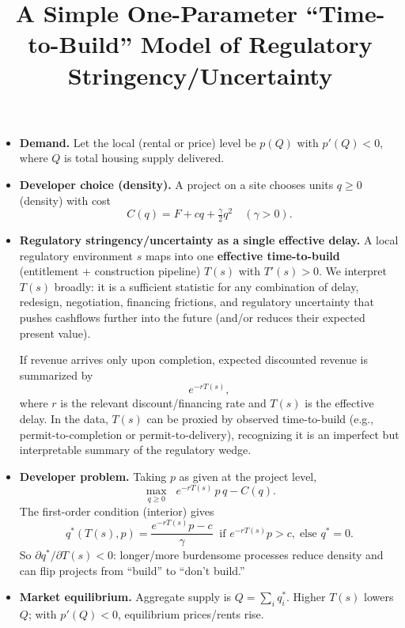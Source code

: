 \documentclass[11pt]{article}
\title{A Simple One-Parameter ``Time-to-Build'' Model of Regulatory Stringency/Uncertainty}
\author{}
\date{}
\begin{document}
\maketitle

\begin{itemize}
  \item \textbf{Demand.} Let the local (rental or price) level be $p(Q)$ with $p'(Q)<0$, where $Q$ is total housing supply delivered.

  \item \textbf{Developer choice (density).} A project on a site chooses units $q\ge 0$ (density) with cost
  \[
    C(q)=F+cq+\tfrac{\gamma}{2}q^2 \quad (\gamma>0).
  \]

  \item \textbf{Regulatory stringency/uncertainty as a single effective delay.} A local regulatory environment $s$ maps into one \textbf{effective time-to-build} (entitlement + construction pipeline) $T(s)$ with $T'(s)>0$. We interpret $T(s)$ broadly: it is a sufficient statistic for any combination of delay, redesign, negotiation, financing frictions, and regulatory uncertainty that pushes cashflows further into the future (and/or reduces their expected present value).

  If revenue arrives only upon completion, expected discounted revenue is summarized by
  \[
    e^{-rT(s)},
  \]
  where $r$ is the relevant discount/financing rate and $T(s)$ is the effective delay. In the data, $T(s)$ can be proxied by observed time-to-build (e.g., permit-to-completion or permit-to-delivery), recognizing it is an imperfect but interpretable summary of the regulatory wedge.

  \item \textbf{Developer problem.} Taking $p$ as given at the project level,
  \[
    \max_{q\ge 0}\;\; e^{-rT(s)}\,p\,q - C(q).
  \]
  The first-order condition (interior) gives
  \[
    q^*(T(s),p)=\frac{e^{-rT(s)}p - c}{\gamma}
    \;\;\text{if }e^{-rT(s)}p>c,\;\text{else }q^*=0.
  \]
  So $\partial q^*/\partial T(s)<0$: longer/more burdensome processes reduce density and can flip projects from ``build'' to ``don't build.''

  \item \textbf{Market equilibrium.} Aggregate supply is $Q=\sum_i q_i^*$. Higher $T(s)$ lowers $Q$; with $p'(Q)<0$, equilibrium prices/rents rise.
\end{itemize}
\end{document}
